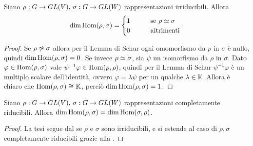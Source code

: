 \begin{corollary}
Siano $\rho:G\to GL(V),\,\allowbreak\sigma:G\to GL(W)$ rappresentazioni irriducibili. Allora
$$
\dim\operatorname{Hom}(\rho,\sigma)=
\begin{cases}
1\qquad&\text{se $\rho\simeq\sigma$}\\
0\qquad&\text{altrimenti}
\end{cases}.
$$
\end{corollary}
\begin{proof}
Se $\rho\not\simeq\sigma$ allora per il Lemma di Schur ogni omomorfismo da $\rho$ in $\sigma$ è nullo, quindi $\dim\operatorname{Hom}(\rho,\sigma)=0$. Se invece $\rho\simeq\sigma$, sia $\psi$ un isomorfismo da $\rho$ in $\sigma$. Dato $\varphi\in\operatorname{Hom}(\rho,\sigma)$ vale $\psi^{-1}\varphi\in\operatorname{Hom}(\rho,\rho)$, quindi per il Lemma di Schur $\psi^{-1}\varphi$ è un multiplo scalare dell'identità, ovvero $\varphi=\lambda\psi$ per un qualche $\lambda\in\mathbb{K}$. Allora è chiaro che $\operatorname{Hom}(\rho,\sigma)\cong\mathbb{K}$, perciò $\dim\operatorname{Hom}(\rho,\sigma)=1$.
\end{proof}

\begin{corollary}
Siano $\rho:G\to GL(V),\,\allowbreak\sigma:G\to GL(W)$ rappresentazioni completamente riducibili. Allora $\dim\operatorname{Hom}(\rho,\sigma)=\dim\operatorname{Hom}(\sigma,\rho)$.
\end{corollary}
\begin{proof}
La tesi segue dal  se $\rho$ e $\sigma$ sono irriducibili, e si estende al caso di $\rho\comma\sigma$ completamente riducibili grazie alla .
\end{proof}

